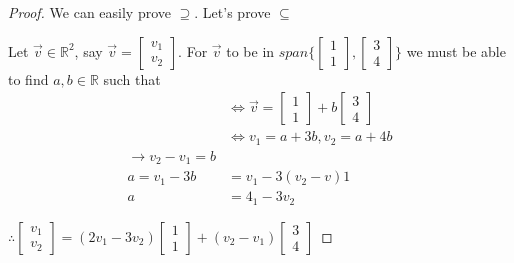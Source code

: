 \documentclass[11pt]{article}
\theoremstyle{plain}
\theoremstyle{remark}
\theoremstyle{plain}
\newcommand{\rn}{\mathbb{R}}
\begin{document}
\begin{proof}
    We can easily prove $\supseteq$. Let's prove $\subseteq$

    Let $\overrightarrow{v}\in\rn^2$, say $\overrightarrow{v}=\begin{bmatrix}
        v_1\\v_2
    \end{bmatrix}$. For $\overrightarrow{v}$ to be in $span\{\begin{bmatrix}
        1\\1
    \end{bmatrix}, \begin{bmatrix}
        3\\4
    \end{bmatrix}\}$ we must be able to find $a,b\in\rn$ such that 
    \begin{align*}
        &\iff \overrightarrow{v}=\begin{bmatrix}
            1\\1
        \end{bmatrix}+b\begin{bmatrix}
            3\\4
        \end{bmatrix}\\
        &\iff v_1=a+3b, v_2=a+4b \\
        \rightarrow v_2-v_1=b\\a=v_1-3b&=v_1-3(v_2-v)1\\a&=4_1-3v_2
    \end{align*}

    $\therefore \begin{bmatrix}
        v_1\\v_2
    \end{bmatrix}=(2v_1-3v_2)\begin{bmatrix}
        1\\1
    \end{bmatrix}+(v_2-v_1)\begin{bmatrix}
        3\\4
    \end{bmatrix}$
\end{proof}
\end{document}
